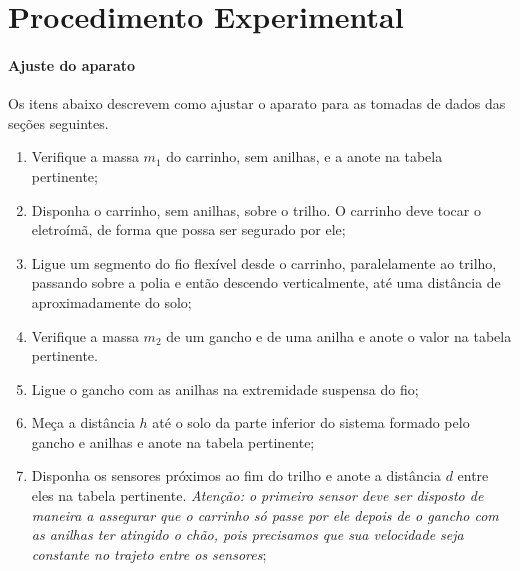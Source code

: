 \section{Procedimento Experimental}

\paragraph{Ajuste do aparato}
\label{subsec:ajustedoaparatoenergia}

Os itens abaixo descrevem como ajustar o aparato para as tomadas de dados das seções seguintes.
\begin{enumerate}
    \item Verifique a massa $m_1$ do carrinho, sem anilhas, e a anote na tabela pertinente;
	\item Disponha o carrinho, sem anilhas, sobre o trilho. O carrinho deve tocar o eletroímã, de forma que possa ser segurado por ele;
	\item Ligue um segmento do fio flexível desde o carrinho, paralelamente ao trilho, passando sobre a polia e então descendo verticalmente, até uma distância de aproximadamente  do solo;
	\item Verifique a massa $m_2$ de um gancho e de uma anilha e anote o valor na tabela pertinente.
	\item Ligue o gancho com as anilhas na extremidade suspensa do fio;
	\item Meça a distância $h$ até o solo da parte inferior do sistema formado pelo gancho e anilhas e anote na tabela pertinente;
	\item Disponha os sensores próximos ao fim do trilho e anote a distância $d$ entre eles na tabela pertinente. \emph{Atenção: o primeiro sensor deve ser disposto de maneira a assegurar que o carrinho só passe por ele depois de o gancho com as anilhas ter atingido o chão, pois precisamos que sua velocidade seja constante no trajeto entre os sensores};
\end{enumerate}

